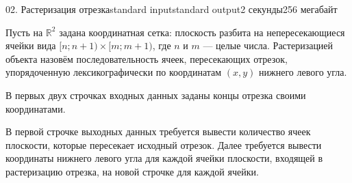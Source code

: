 \begin{problem}{02. Растеризация отрезка}{standard input}{standard output}{2 секунды}{256 мегабайт}

Пусть на $\mathbb R^2$ задана координатная сетка: плоскость разбита на непересекающиеся ячейки вида $[n; n + 1) \times [m; m + 1)$, где $n$ и $m$ --- целые числа. Растеризацией объекта назовём последовательность ячеек, пересекающих отрезок, упорядоченную лексикографически по координатам $(x, y)$ нижнего левого угла.

\InputFile

В первых двух строчках входных данных заданы концы отрезка своими координатами.

\OutputFile

В первой строчке выходных данных требуется вывести количество ячеек плоскости, которые пересекает исходный отрезок. Далее требуется вывести координаты нижнего левого угла для каждой ячейки плоскости, входящей в растеризацию отрезка, на новой строчке для каждой ячейки.

\Examples

\begin{example}%
%
%
\end{example}

\end{problem}
